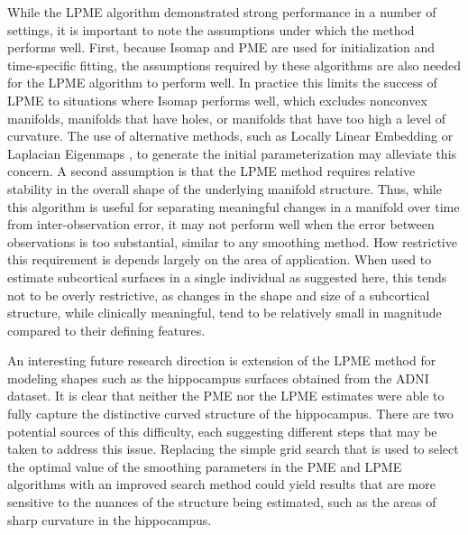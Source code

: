 \documentclass[12pt]{article}
\theoremstyle{definition}
\begin{document}
While the LPME algorithm demonstrated strong performance in a number of settings, it is important to note the assumptions under which the method performs well. First, because Isomap and PME are used for initialization and time-specific fitting, the assumptions required by these algorithms are also needed for the LPME algorithm to perform well. In practice this limits the success of LPME to situations where Isomap performs well, which excludes nonconvex manifolds, manifolds that have holes, or manifolds that have too high a level of curvature. The use of alternative methods, such as Locally Linear Embedding \citep{roweis2000Nonlinear} or Laplacian Eigenmaps \citep{belkin2003laplacian}, to generate the initial parameterization may alleviate this concern. A second assumption is that the LPME method requires relative stability in the overall shape of the underlying manifold structure. Thus, while this algorithm is useful for separating meaningful changes in a manifold over time from inter-observation error, it may not perform well when the error between observations is too substantial, similar to any smoothing method. How restrictive this requirement is depends largely on the area of application. When used to estimate subcortical surfaces in a single individual as suggested here, this tends not to be overly restrictive, as changes in the shape and size of a subcortical structure, while clinically meaningful, tend to be relatively small in magnitude compared to their defining features.

An interesting future research direction is extension of the LPME method for modeling  shapes such as the hippocampus surfaces obtained from the ADNI dataset. It is clear that neither the PME nor the LPME estimates were able to fully capture the distinctive curved structure of the hippocampus. There are two potential sources of this difficulty, each suggesting different steps that may be taken to address this issue. Replacing the simple grid search that is used to select the optimal value of the smoothing parameters in the PME and LPME algorithms with an improved search method could yield results that are more sensitive to the nuances of the structure being estimated, such as the areas of sharp curvature in the hippocampus.
\end{document}
